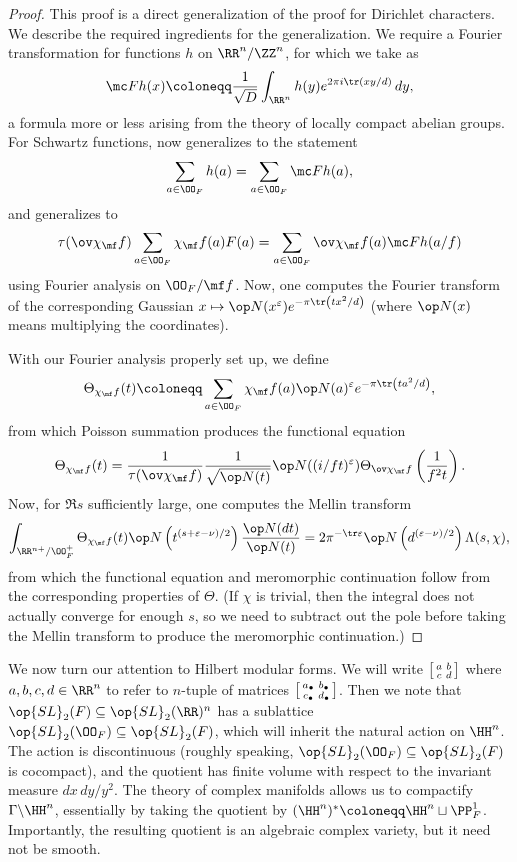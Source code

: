 \documentclass{article}
\begin{document}
\begin{proof}
	This proof is a direct generalization of the proof for Dirichlet characters. We describe the required ingredients for the generalization. We require a Fourier transformation for functions $h$ on $\RR^n/\ZZ^n$, for which we take as
	\[\mc Fh(x)\coloneqq\frac1{\sqrt D}\int_{\RR^n}h(y)e^{2\pi i\tr(xy/d)}\,dy,\]
	a formula more or less arising from the theory of locally compact abelian groups. For Schwartz functions,  now generalizes to the statement
	\[\sum_{a\in\OO_F}h(a)=\sum_{a\in\OO_F}\mc Fh(a),\]
	and  generalizes to
	\[\tau(\ov\chi_\mf f)\sum_{a\in\OO_F}\chi_\mf f(a)F(a)=\sum_{a\in\OO_F}\ov\chi_\mf f(a)\mc Fh(a/f)\]
	using Fourier analysis on $\OO_F/\mf f$. Now, one computes the Fourier transform of the corresponding Gaussian $x\mapsto\op N(x^\varepsilon) e^{-\pi\tr\left(tx^2/d\right)}$ (where $\op N(x)$ means multiplying the coordinates).

	With our Fourier analysis properly set up, we define
	\[\Theta_{\chi_\mf f}(t)\coloneqq\sum_{a\in\OO_F}\chi_\mf f(a)\op N(a)^\varepsilon e^{-\pi\tr\left(ta^2/d\right)},\]
	from which Poisson summation produces the functional equation
	\[\Theta_{\chi_\mf f}(t)=\frac1{\tau(\ov\chi_\mf f)}\frac1{\sqrt{\op N(t)}}\op N((i/ft)^\varepsilon)\Theta_{\ov\chi_\mf f}\left(\frac1{f^2t}\right).\]
	Now, for $\Re s$ sufficiently large, one computes the Mellin transform
	\[\int_{\RR^{n+}/\OO_F^+}\Theta_{\chi_\mf f}(t)\op N\left(t^{(s+\varepsilon-\nu)/2}\right)\frac{\op N(dt)}{\op N(t)}=2\pi^{-\tr\varepsilon}\op N\left(d^{(\varepsilon-\nu)/2}\right)\Lambda(s,\chi),\]
	from which the functional equation and meromorphic continuation follow from the corresponding properties of $\Theta$. (If $\chi$ is trivial, then the integral does not actually converge for enough $s$, so we need to subtract out the pole before taking the Mellin transform to produce the meromorphic continuation.)
\end{proof}
We now turn our attention to Hilbert modular forms. We will write $\begin{bsmallmatrix}
	a & b \\ c & d
\end{bsmallmatrix}$ where $a,b,c,d\in\RR^n$ to refer to $n$-tuple of matrices $\begin{bsmallmatrix}
	a_\bullet & b_\bullet \\ c_\bullet & d_\bullet
\end{bsmallmatrix}$. Then we note that $\op{SL}_2(F)\subseteq\op{SL}_2(\RR)^n$ has a sublattice $\op{SL}_2(\OO_F)\subseteq\op{SL}_2(F)$, which will inherit the natural action on $\HH^n$. The action is discontinuous (roughly speaking, $\op{SL}_2(\OO_F)\subseteq\op{SL}_2(F)$ is cocompact), and the quotient has finite volume with respect to the invariant measure $dx\,dy/y^2$. The theory of complex manifolds allows us to compactify $\Gamma\backslash\HH^n$, essentially by taking the quotient by $(\HH^n)^*\coloneqq\HH^n\sqcup\PP^1_F$. Importantly, the resulting quotient is an algebraic complex variety, but it need not be smooth.
\end{document}
